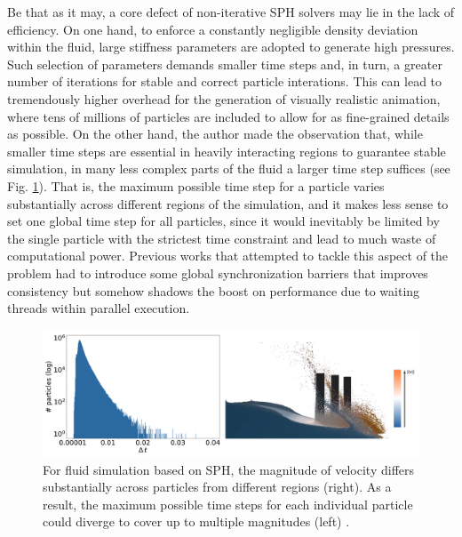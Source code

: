 \documentclass[
	11pt, 
	DIV10,
	ngerman,
	a4paper, 
	oneside, 
	headings=normal, 
	captions=tableheading,
	final, 
	numbers=noenddot
]{scrartcl}
\begin{document}
\par
Be that as it may, a core defect of non-iterative SPH solvers may lie in the lack of efficiency. On one hand, to enforce a constantly negligible density deviation within the fluid, large stiffness parameters are adopted to generate high pressures. Such selection of parameters demands smaller time steps and, in turn, a greater number of iterations for stable and correct particle interations. This can lead to tremendously higher overhead for the generation of visually realistic animation, where tens of millions of particles are included to allow for as fine-grained details as possible. On the other hand, the author made the observation that, while smaller time steps are essential in heavily interacting regions to guarantee stable simulation, in many less complex parts of the fluid a larger time step suffices (see Fig. \ref{fig2}). That is, the maximum possible time step for a particle varies substantially across different regions of the simulation, and it makes less sense to set one global time step for all particles, since it would inevitably be limited by the single particle with the strictest time constraint and lead to much waste of computational power. Previous works that attempted to tackle this aspect of the problem had to introduce some global synchronization barriers that improves consistency but somehow shadows the boost on performance due to waiting threads within parallel execution.

\begin{figure}[tb]
	\centering
	\includegraphics[scale=0.25]{images/1}
	\caption{\label{fig2} For fluid simulation based on SPH, the magnitude of velocity differs substantially across particles from different regions (right). As a result, the maximum possible time steps for each individual particle could diverge to cover up to multiple magnitudes (left) \cite{reinhardt2017fully}.}
\end{figure}
\end{document}
